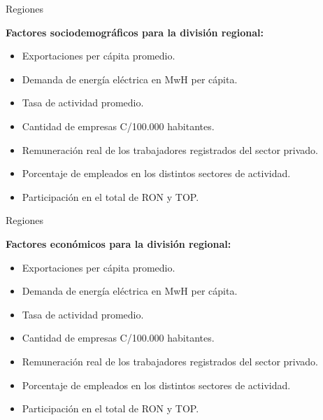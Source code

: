 \documentclass[11pt]{beamer}
\begin{document}


\begin{frame}[t]{Regiones}

\textbf{Factores sociodemográficos para la división regional:}
\begin{itemize}
\item Exportaciones per cápita promedio.
\item Demanda de energía eléctrica en MwH per cápita.
 \item Tasa de actividad promedio.
 \item Cantidad de empresas C/100.000 habitantes.
 \item Remuneración real de los trabajadores registrados del sector privado.
 \item Porcentaje de empleados en los distintos sectores de actividad.
 \item Participación en el total de RON y TOP.
 
 
\end{itemize}

\end{frame}



\begin{frame}[t]{Regiones}

\textbf{Factores económicos para la división regional:}
\begin{itemize}
\item Exportaciones per cápita promedio.
\item Demanda de energía eléctrica en MwH per cápita.
 \item Tasa de actividad promedio.
 \item Cantidad de empresas C/100.000 habitantes.
 \item Remuneración real de los trabajadores registrados del sector privado.
 \item Porcentaje de empleados en los distintos sectores de actividad.
 \item Participación en el total de RON y TOP.
 
 
\end{itemize}

\end{frame}
\end{document}
